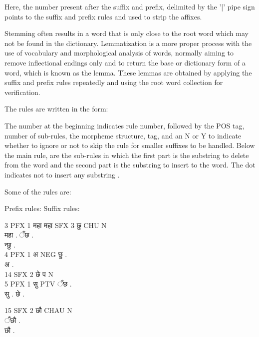 \documentclass[conference]{IEEEtran}
\begin{document}
\begin{enumerate}
Here, the number present after the suffix and prefix, delimited by the '|' pipe
sign points to the suffix and prefix rules and used to strip
the affixes.
\medskip

Stemming often results in a word that is only close to the root word which may
not be found in the dictionary. Lemmatization is a more proper process with the
use of vocabulary and morphological analysis of words, normally aiming to remove
inflectional endings only and to return the base or dictionary form of a word, 
which is known as the lemma. These lemmas are obtained by applying the suffix 
and prefix rules repeatedly and using the root word collection for verification.
\medskip

The rules are written in the form:\\

\medskip

The number at the beginning indicates rule number, followed by the POS tag, 
number of sub-rules, the morpheme structure, tag, and an N or Y to indicate 
whether to ignore or not to skip the rule for smaller suffixes to be handled.
Below the main rule, are the sub-rules in which the first part is the substring 
to delete from the word and the second part is the substring to insert to the 
word. The dot indicates not to insert any substring \cite{r10}.
\medskip

Some of the rules are:

Prefix rules: \qquad \qquad Suffix rules:\\

\begin{sanskrit}
3 PFX 1 महा महा \qquad {} SFX 3 छु CHU N\\
महा .\hspace{80pt} ँछ .\\
\phantom{x}\hspace{96pt} न्छु .\\
4 PFX 1 अ NEG \hspace{40pt}छु .\\
अ .\\
\phantom{x}\hspace{96pt}14 SFX 2 छे प N\\
5 PFX 1 सु PTV\hspace{35pt} ँछ .\\
सु .\hspace{88pt} छे .

\phantom{x}\hspace{96pt}15 SFX 2 छौ CHAU N\\
\phantom{x}\hspace{96pt}ँछौ .\\
\phantom{x}\hspace{96pt}छौ .
\end{sanskrit}
\medskip



\end{enumerate}
\end{document}
